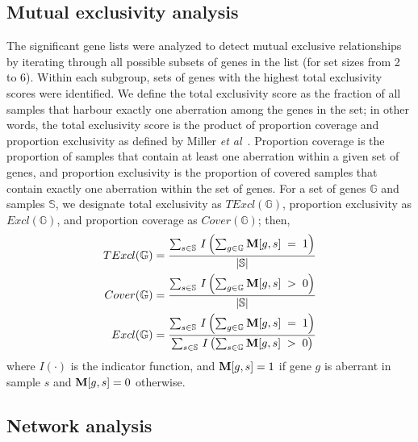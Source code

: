 \subsection{Mutual exclusivity analysis}

The significant gene lists were analyzed to detect mutual exclusive relationships by iterating through all possible subsets of genes in the list (for set sizes from 2 to 6). Within each subgroup, sets of genes with the highest total exclusivity scores were identified. We define the total exclusivity score as the fraction of all samples that harbour exactly one aberration among the genes in the set; in other words, the total exclusivity score is the product of proportion coverage and proportion exclusivity as defined by Miller \emph{et al}\ . Proportion coverage is the proportion of samples that contain at least one aberration within a given set of genes, and proportion exclusivity is the proportion of covered samples that contain exactly one aberration within the set of genes. For a set of genes $\mathbb{G}$ and samples $\mathbb{S}$, we designate total exclusivity as $TExcl(\mathbb{G})$, proportion exclusivity as $Excl(\mathbb{G})$, and proportion coverage as $Cover(\mathbb{G})$; then,
\begin{align*}
TExcl(\mathbb{G}) &= \frac
{\sum_{s \in \mathbb{S}} \, I \left( \sum_{g \in \mathbb{G}} \mathbf{M}[g, s] \; = \; 1 \right) }
{|\mathbb{S}|}\\
Cover(\mathbb{G}) &= \frac
{\sum_{s \in \mathbb{S}} \, I \left( \sum_{g \in \mathbb{G}} \mathbf{M}[g, s] \; > \; 0 \right) }
{|\mathbb{S}|}\\
Excl(\mathbb{G}) &= \frac
{\sum_{s \in \mathbb{S}} \, I \left( \sum_{g \in \mathbb{G}} \mathbf{M}[g, s] \; = \; 1 \right) }
{\sum_{s \in \mathbb{S}} \, I \left( \sum_{s \in \mathbb{G}} \mathbf{M}[g, s] \; > \; 0 \right) }
\end{align*}
where $I(\cdot)$ is the indicator function, and $\mathbf{M}[g, s] = 1$ if gene $g$ is aberrant in sample $s$ and $\mathbf{M}[g, s] = 0$ otherwise.

\subsection{Network analysis}

